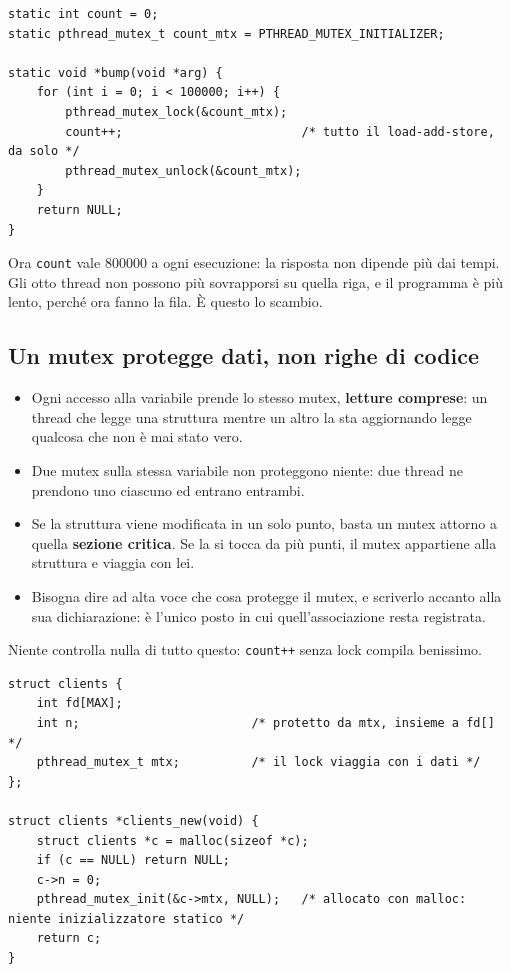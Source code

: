 \begin{lstlisting}[language={[POSIX]C}, style=wnumbers, title={Il contatore, corretto}]
static int count = 0;
static pthread_mutex_t count_mtx = PTHREAD_MUTEX_INITIALIZER;

static void *bump(void *arg) {
    for (int i = 0; i < 100000; i++) {
        pthread_mutex_lock(&count_mtx);
        count++;                         /* tutto il load-add-store, da solo */
        pthread_mutex_unlock(&count_mtx);
    }
    return NULL;
}
\end{lstlisting}

Ora \texttt{count} vale 800000 a ogni esecuzione: la risposta non dipende più dai tempi. Gli otto thread non possono più
sovrapporsi su quella riga, e il programma è più lento, perché ora fanno la fila. È questo lo scambio.

\subsection{Un mutex protegge dati, non righe di codice}

\begin{itemize}
    \item Ogni accesso alla variabile prende lo stesso mutex, \textbf{letture comprese}: un thread che legge una struttura
          mentre un altro la sta aggiornando legge qualcosa che non è mai stato vero.
    \item Due mutex sulla stessa variabile non proteggono niente: due thread ne prendono uno ciascuno ed entrano entrambi.
    \item Se la struttura viene modificata in un solo punto, basta un mutex attorno a quella \textbf{sezione critica}. Se la
          si tocca da più punti, il mutex appartiene alla struttura e viaggia con lei.
    \item Bisogna dire ad alta voce che cosa protegge il mutex, e scriverlo accanto alla sua dichiarazione: è l'unico posto
          in cui quell'associazione resta registrata.
\end{itemize}
Niente controlla nulla di tutto questo: \texttt{count++} senza lock compila benissimo.

\begin{lstlisting}[language={[POSIX]C}, style=wnumbers, title={Il lock dentro la struttura che protegge}]
struct clients {
    int fd[MAX];
    int n;                        /* protetto da mtx, insieme a fd[] */
    pthread_mutex_t mtx;          /* il lock viaggia con i dati */
};

struct clients *clients_new(void) {
    struct clients *c = malloc(sizeof *c);
    if (c == NULL) return NULL;
    c->n = 0;
    pthread_mutex_init(&c->mtx, NULL);   /* allocato con malloc: niente inizializzatore statico */
    return c;
}
\end{lstlisting}

